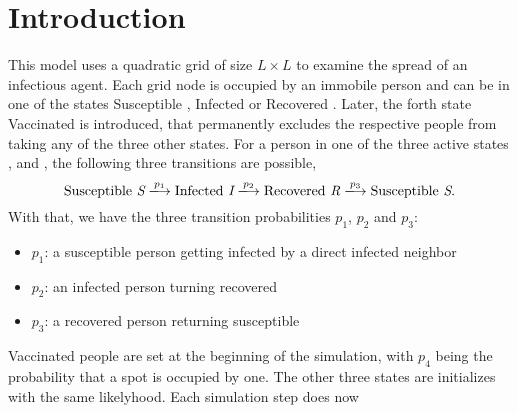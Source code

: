 \section{Introduction}


This model uses a quadratic grid of size $L\times L$ to examine the spread of an infectious agent. Each grid node is occupied by an immobile person and can be in one of the states
Susceptible \susceptible{}, Infected \infected{} or Recovered \recovered{}. Later, the forth state Vaccinated \vaccinated{} is introduced, that permanently excludes the respective people from taking any of the three other states. For a person 
in one of the three active states \susceptible{}, \infected{} and \recovered{}, the following three transitions are possible,
\begin{equation*}
    \mathrm{Susceptible}~\susceptible\xlongrightarrow{p_1}\mathrm{Infected}~\infected{}\xlongrightarrow{p_2}\mathrm{Recovered}~\recovered{}\xlongrightarrow{p_3}\mathrm{Susceptible}~\susceptible{}.
\end{equation*}
With that, we have the three transition probabilities $p_1$, $p_2$ and $p_3$:
\begin{itemize}
    \item $p_1$: a susceptible person getting infected by a direct infected neighbor
    \item $p_2$: an infected person turning recovered
    \item $p_3$: a recovered person returning susceptible
\end{itemize}
Vaccinated people \vaccinated{} are set at the beginning of the simulation, with $p_4$ being the probability that a spot is occupied by one. The other three states are initializes with the same likelyhood. Each simulation step does
now
